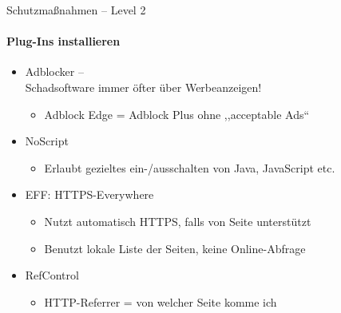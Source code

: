 \begin{frame}{Schutzmaßnahmen -- Level 2}
\framesubtitle{Plug-Ins installieren}
  \begin{itemize}
    \item Adblocker --\\ Schadsoftware immer öfter über Werbeanzeigen!
    \begin{itemize}
      \item Adblock Edge = Adblock Plus ohne ,,acceptable Ads``
    \end{itemize}
    \item NoScript
    \begin{itemize}
      \item Erlaubt gezieltes ein-/ausschalten von Java, JavaScript etc.
    \end{itemize}
    \item EFF: HTTPS-Everywhere
    \begin{itemize}
      \item Nutzt automatisch HTTPS, falls von Seite unterstützt
      \item Benutzt lokale Liste der Seiten, keine Online-Abfrage
    \end{itemize}
    \item RefControl
    \begin{itemize}
      \item HTTP-Referrer = von welcher Seite komme ich
    \end{itemize}
  \end{itemize}
\end{frame}

